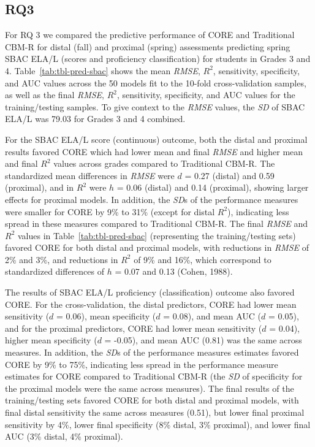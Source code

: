 \documentclass[
  english,
  man, fleqn, noextraspace]{apa6}
\begin{document}
\hypertarget{rq3}{%
\subsection{RQ3}\label{rq3}}

For RQ 3 we compared the predictive performance of CORE and Traditional CBM-R for distal (fall) and proximal (spring) assessments predicting spring SBAC ELA/L (scores and proficiency classification) for students in Grades 3 and 4. Table~\ref{tab:tbl-pred-sbac} shows the mean \emph{RMSE}, \(R^2\), sensitivity, specificity, and AUC values across the 50 models fit to the 10-fold cross-validation samples, as well as the final \emph{RMSE}, \(R^2\), sensitivity, specificity, and AUC values for the training/testing samples. To give context to the \emph{RMSE} values, the \emph{SD} of SBAC ELA/L was 79.03 for Grades 3 and 4 combined.

For the SBAC ELA/L score (continuous) outcome, both the distal and proximal results favored CORE which had lower mean and final \emph{RMSE} and higher mean and final \(R^2\) values across grades compared to Traditional CBM-R. The standardized mean differences in \emph{RMSE} were \(d\) = 0.27 (distal) and 0.59 (proximal), and in \(R^2\) were \(h\) = 0.06 (distal) and 0.14 (proximal), showing larger effects for proximal models. In addition, the \emph{SD}s of the performance measures were smaller for CORE by 9\% to 31\% (except for distal \(R^2\)), indicating less spread in these measures compared to Traditional CBM-R. The final \emph{RMSE} and \(R^2\) values in Table~\ref{tab:tbl-pred-sbac} (representing the training/testing sets) favored CORE for both distal and proximal models, with reductions in \emph{RMSE} of 2\% and 3\%, and reductions in \(R^2\) of 9\% and 16\%, which correspond to standardized differences of \(h\) = 0.07 and 0.13 (Cohen, 1988).

The results of SBAC ELA/L proficiency (classification) outcome also favored CORE. For the cross-validation, the distal predictors, CORE had lower mean sensitivity (\(d\) = 0.06), mean specificity (\(d\) = 0.08), and mean AUC (\(d\) = 0.05), and for the proximal predictors, CORE had lower mean sensitivity (\(d\) = 0.04), higher mean specificity (\(d\) = -0.05), and mean AUC (0.81) was the same across measures. In addition, the \emph{SD}s of the performance measures estimates favored CORE by 9\% to 75\%, indicating less spread in the performance measure estimates for CORE compared to Traditional CBM-R (the \emph{SD} of specificity for the proximal models were the same across measures). The final results of the training/testing sets favored CORE for both distal and proximal models, with final distal sensitivity the same across measures (0.51), but lower final proximal sensitivity by 4\%, lower final specificity (8\% distal, 3\% proximal), and lower final AUC (3\% distal, 4\% proximal).
\end{document}
